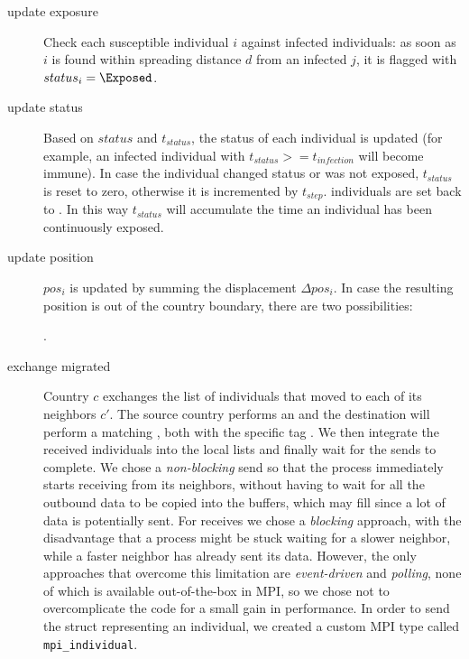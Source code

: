 \begin{description}
    \item[update exposure] Check each susceptible individual $i$ against infected individuals: as soon as $i$ is found within spreading distance $d$ from an infected $j$, it is flagged with $status_i = \Exposed$.

    \item[update status] Based on $status$ and $t_{status}$, the status of each individual is updated (for example, an infected individual with $t_{status} >= t_{infection}$ will become immune). In case the individual changed status or was not exposed, $t_{status}$ is reset to zero, otherwise it is incremented by $t_{step}$. \Exposed individuals are set back to \NotExposed. In this way $t_{status}$ will accumulate the time an individual has been continuously exposed.
     
    \item[update position] $pos_i$ is updated by summing the displacement $\Delta pos_i$. In case the resulting position is out of the country boundary, there are two possibilities:
    .

    \item[exchange migrated] Country $c$ exchanges the list of individuals that moved to each of its neighbors $c'$. The source country performs an \MPIIsend and the destination will perform a matching \MPIRecv , both with the specific tag \MigratedTag.
    We then integrate the received individuals into the local lists and finally wait for the sends to complete.
    We chose a \emph{non-blocking} send so that the process immediately starts receiving from its neighbors, without having to wait for all the outbound data to be copied into the buffers, which may fill since a lot of data is potentially sent. For receives we chose a \emph{blocking} approach, with the disadvantage that a process might be stuck waiting for a slower neighbor, while a faster neighbor has already sent its data. However, the only approaches that overcome this limitation are \emph{event-driven} and \emph{polling}, none of which is available out-of-the-box in MPI, so we chose not to overcomplicate the code for a small gain in performance.
    In order to send the struct representing an individual, we created a custom MPI type called \texttt{mpi\_individual}.


\end{description}

